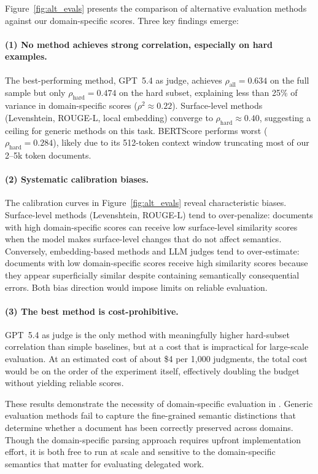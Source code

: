 \documentclass{article} %
\begin{document}
Figure~\ref{fig:alt_evals} presents the comparison of alternative evaluation methods against our domain-specific scores. Three key findings emerge:

\paragraph{(1) No method achieves strong correlation, especially on hard examples.} The best-performing method, GPT~5.4 as judge, achieves $\rho_{\mathrm{all}} = 0.634$ on the full sample but only $\rho_{\mathrm{hard}} = 0.474$ on the hard subset, explaining less than 25\% of variance in domain-specific scores ($\rho^2 \approx 0.22$). Surface-level methods (Levenshtein, ROUGE-L, local embedding) converge to $\rho_{\mathrm{hard}} \approx 0.40$, suggesting a ceiling for generic methods on this task. BERTScore performs worst ($\rho_{\mathrm{hard}} = 0.284$), likely due to its 512-token context window truncating most of our 2--5k token documents.

\paragraph{(2) Systematic calibration biases.} The calibration curves in Figure~\ref{fig:alt_evals} reveal characteristic biases. Surface-level methods (Levenshtein, ROUGE-L) tend to over-penalize: documents with high domain-specific scores can receive low surface-level similarity scores when the model makes surface-level changes that do not affect semantics. Conversely, embedding-based methods and LLM judges tend to over-estimate: documents with low domain-specific scores receive high similarity scores because they appear superficially similar despite containing semantically consequential errors. Both bias direction would impose limits on reliable evaluation.

\paragraph{(3) The best method is cost-prohibitive.} GPT~5.4 as judge is the only method with meaningfully higher hard-subset correlation than simple baselines, but at a cost that is impractical for large-scale evaluation. At an estimated cost of about \$4 per 1{,}000 judgments, the total cost would be on the order of the experiment itself, effectively doubling the budget without yielding reliable scores.

These results demonstrate the necessity of domain-specific evaluation in \benchmark{}. Generic evaluation methods fail to capture the fine-grained semantic distinctions that determine whether a document has been correctly preserved across domains. Though the domain-specific parsing approach requires upfront implementation effort, it is both free to run at scale and sensitive to the domain-specific semantics that matter for evaluating delegated work.
\end{document}
